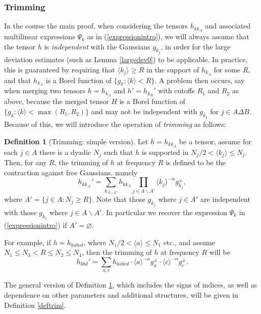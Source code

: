 \documentclass[11 pt,reqno]{amsart}
\theoremstyle{definition}
\newtheorem{df}[thm]{Definition}
\theoremstyle{remark}
\numberwithin{equation}{section}
\begin{document}
  \subsubsection{Trimming}\label{introtrim} In the course the main proof, when considering the tensors $h_{kk_A}$ and associated multilinear expressions $\Psi_k$ as in (\ref{expressionintro}), we will always assume that the tensor $h$ is \emph{independent} with the Gaussians $g_{k_j}$, in order for the large deviation estimates (such as Lemma \ref{largedev0}) to be applicable. In practice, this is guaranteed by requiring that $\langle k_j\rangle\geq R$ in the support of $h_{k_A}$ for some $R$, and that $h_{k_A}$ is a Borel function of $\{g_k:\langle k\rangle<R\}$. A problem then occurs, say when merging two tensors $h=h_{k_A}$ and $h'=h_{k_B}'$ with cutoffs $R_1$ and $R_2$ as above, because the merged tensor $H$ is a Borel function of $\{g_k:\langle k\rangle<\max(R_1,R_2)\}$ and may not be independent with $g_{k_j}$ for $j\in A\Delta B$. Because of this, we will introduce the operation of \emph{trimming} as follows:
  \begin{df}[Trimming: simple version]\label{deftrim0} Let $h=h_{kk_A}$ be a tensor, assume for each $j\in A$ there is a dyadic $N_j$ such that $h$ is supported in $N_j/2<\langle k_j\rangle\leq N_j$. Then, for any $R$, the trimming of $h$ at frequency $R$ is defined to be the contraction against free Gaussians, namely
  \[h_{kk_{A'}}'=\sum_{k_{A\backslash A'}}h_{kk_A}\prod_{j\in A\backslash A'}\langle k_j\rangle^{-\alpha}g_{k_j}^\pm,\] where $A'=\{j\in A:N_j\geq R\}$. Note that those $g_{k_j}$ where $j\in A'$ are independent with those $g_{k_j}$ where $j\in A\backslash A'$. In particular we recover the expression $\Psi_k$ in (\ref{expressionintro}) if $A'=\varnothing$.
  \end{df} For example, if $h=h_{kabcd}$, where $N_1/2<\langle a\rangle\leq N_1$ etc., and assume $N_1\leq N_3<R\leq N_2\leq N_4$, then the trimming of $h$ at frequency $R$ will be
  \[h_{kbd}'=\sum_{a,c}h_{kabcd}\cdot\langle a\rangle^{-\alpha}g_a^\pm \cdot\langle c\rangle^{-\alpha}g_c^\pm.\]
  
The general version of Definition \ref{deftrim0}, which includes the signs of indices, as well as dependence on other parameters and additional structures, will be given in Definition \ref{deftrim}.
\end{document}
